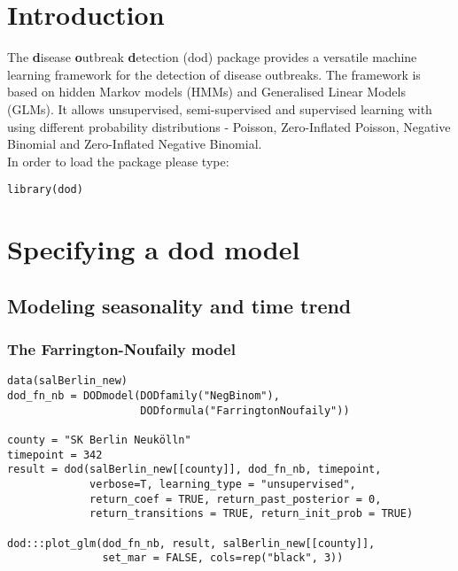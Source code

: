 \documentclass[a4paper]{article}\usepackage[]{graphicx}\usepackage[]{color}
\makeatletter
\newenvironment{kframe}{%
 \def\at@end@of@kframe{}%
 \ifinner\ifhmode%
  \def\at@end@of@kframe{\end{minipage}}%
  \begin{minipage}{\columnwidth}%
 \fi\fi%
 \def\FrameCommand##1{\hskip\@totalleftmargin \hskip-\fboxsep
 \colorbox{shadecolor}{##1}\hskip-\fboxsep
     \hskip-\linewidth \hskip-\@totalleftmargin \hskip\columnwidth}%
 \MakeFramed {\advance\hsize-\width
   \@totalleftmargin\z@ \linewidth\hsize
   \@setminipage}}%
 {\par\unskip\endMakeFramed%
 \at@end@of@kframe}
\newenvironment{knitrout}{}{} %
\makeatother
\begin{document}
\section{Introduction}
\label{sec:0}
The \textbf{d}isease \textbf{o}utbreak \textbf{d}etection (dod) package provides a versatile machine learning framework for the detection of disease outbreaks. The framework is based on hidden Markov models (HMMs) and Generalised Linear Models (GLMs). It allows unsupervised, semi-supervised and supervised learning with using different probability distributions - Poisson, Zero-Inflated Poisson, Negative Binomial and Zero-Inflated Negative Binomial. \\
In order to load the package please type:

\begin{knitrout}
\color{fgcolor}\begin{kframe}
\begin{verbatim}
library(dod)
\end{verbatim}
\end{kframe}
\end{knitrout}

\section{Specifying a dod model}

\subsection{Modeling seasonality and time trend}

\subsubsection{The Farrington-Noufaily model}

\begin{knitrout}
\color{fgcolor}\begin{kframe}
\begin{verbatim}
data(salBerlin_new)
dod_fn_nb = DODmodel(DODfamily("NegBinom"),
                     DODformula("FarringtonNoufaily"))

county = "SK Berlin Neukölln"
timepoint = 342
result = dod(salBerlin_new[[county]], dod_fn_nb, timepoint, 
             verbose=T, learning_type = "unsupervised",
             return_coef = TRUE, return_past_posterior = 0,
             return_transitions = TRUE, return_init_prob = TRUE)

dod:::plot_glm(dod_fn_nb, result, salBerlin_new[[county]], 
               set_mar = FALSE, cols=rep("black", 3))
\end{verbatim}
\end{kframe}
\end{knitrout}
\end{document}

